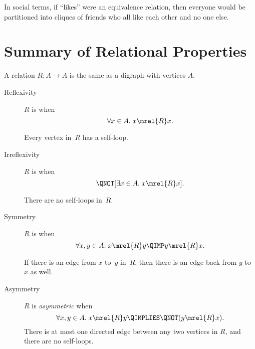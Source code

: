 \begin{definition}
In social terms, if ``likes'' were an equivalence relation, then
everyone would be partitioned into cliques of friends who all like
each other and no one else.

\begin{problems}
\practiceproblems
{}

\classproblems
{}

\homeworkproblems
{}


\end{problems}

\section{Summary of Relational Properties}\label{prop_summary_sec}

A relation $R: A \to A$ is the same as a digraph with vertices $A$.

\begin{description}

\item[Reflexivity]

$R$ is  when
\[
\forall x \in A. \; x \mrel{R} x.
\]


Every vertex in~$R$ has a self-loop.

\item[Irreflexivity]

$R$ is  when
\[
\QNOT[ \exists x \in A. \; x \mrel{R} x].
\]


There are no self-loops in~$R$.

\item[Symmetry]

$R$ is  when
\[
\forall x, y \in A. \; x \mrel{R} y \QIMP y \mrel{R} x.
\]


If there is an edge from $x$ to~$y$ in~$R$, then there is an edge back
from $y$ to~$x$ as well.

\item[Asymmetry]
$R$ is \emph{asymmetric} when
\[
\forall x, y \in A. \; x \mrel{R} y \QIMPLIES \QNOT( y \mrel{R} x ).
\]
There is at most one directed edge between any two vertices in $R$,
and there are no self-loops.


\end{description}
\end{definition}
